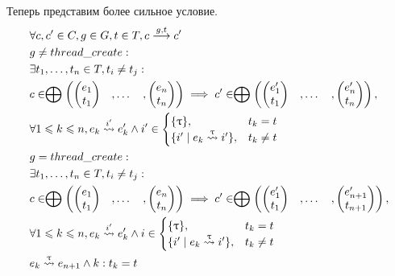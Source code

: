 Теперь представим более сильное условие.
\begin{equation}
\label{transfer_tm_ir_stronger}
\begin{aligned}
& \forall c, c' \in C, g \in G, t \in T, c \stackrel{g,t}{\longrightarrow} c' \\
& g \neq thread\_create:\\
& \exists t_1, \dots, t_n \in T, t_i \neq t_j: \\
& c \in \mathrel{\bigoplus}
\begin{pmatrix}
\begin{pmatrix}
e_1 \\
t_1 
\end{pmatrix}& ,
\dots& ,
\begin{pmatrix}
e_n \\
t_n 
\end{pmatrix}
\end{pmatrix} \implies 
c' \in \mathrel{\bigoplus}
\begin{pmatrix}
\begin{pmatrix}
e_1' \\
t_1 
\end{pmatrix}& ,
\dots& ,
\begin{pmatrix}
e_n' \\
t_n 
\end{pmatrix}
\end{pmatrix}, \\
&\forall 1 \leqslant k \leqslant n, e_k \stackrel{i'}{\leadsto} e_k' \land i' \in \begin{cases}
\{\uptau\}, &\text{$t_k = t$}\\
\{i' \mid e_k \stackrel{\uptau}{\leadsto} i'\},  &\text{$t_k \neq t$}
\end{cases}\\
& g = thread\_create:\\
& \exists t_1, \dots, t_n \in T, t_i \neq t_j: \\
& c \in \mathrel{\bigoplus}
\begin{pmatrix}
\begin{pmatrix}
e_1 \\
t_1 
\end{pmatrix}& ,
\dots& ,
\begin{pmatrix}
e_n \\
t_n 
\end{pmatrix}
\end{pmatrix} \implies 
c' \in \mathrel{\bigoplus}
\begin{pmatrix}
\begin{pmatrix}
e_1' \\
t_1 
\end{pmatrix}& ,
\dots& ,
\begin{pmatrix}
e_{n+1}' \\
t_{n+1} 
\end{pmatrix}
\end{pmatrix}, \\
&\forall 1 \leqslant k \leqslant n, e_k \stackrel{i'}{\leadsto} e_k' \land i \in \begin{cases}
\{\uptau\}, &\text{$t_k = t$}\\
\{i' \mid e_k \stackrel{\uptau}{\leadsto} i'\},  &\text{$t_k \neq t$}
\end{cases} \\
& e_k \stackrel{\uptau}{\leadsto} e_{n+1} \land k: t_k = t
\end{aligned}
\end{equation}

